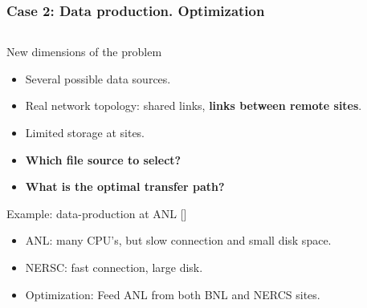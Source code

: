 \documentclass{beamer}
\begin{document}
\begin{frame}\frametitle{Case 2: Data production. Optimization }
 	\begin{columns}[c] %
    \begin{footnotesize}
    \vspace{-20mm}
	\begin{block}{New dimensions of the problem}	
		\begin{itemize}		
			\item Several possible data sources.
			\item Real network topology: shared links, \textbf{links between remote sites}.
			\item Limited storage at sites.
			\item \textbf{Which file source to select?}
			\item \textbf{What is the optimal transfer path?}

		\end{itemize}
 	\end{block}
		\begin{block}{Example: data-production at ANL  [\cite{Balewski}]}	
		\begin{itemize}
			\item ANL: many CPU's, but slow connection and small disk space.
			\item NERSC: fast connection, large disk.
			\item Optimization: Feed ANL from both BNL and NERCS sites.		


\end{itemize}
\end{block}
\end{footnotesize}
\end{columns}
\end{frame}
\end{document}

